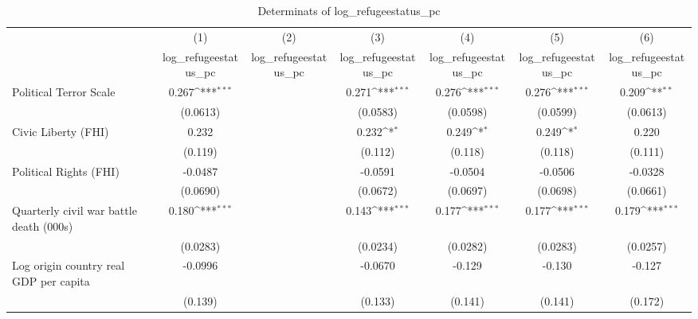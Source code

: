 \begin{table}[htbp]\centering
\def\sym#1{\ifmmode^{#1}\else\(^{#1}\)\fi}
\caption{Determinats of log\_refugeestatus\_pc}
\begin{tabular}{l*{6}{c}}
\hline\hline
                    &\multicolumn{1}{c}{(1)}&\multicolumn{1}{c}{(2)}&\multicolumn{1}{c}{(3)}&\multicolumn{1}{c}{(4)}&\multicolumn{1}{c}{(5)}&\multicolumn{1}{c}{(6)}\\
                    &\multicolumn{1}{c}{log\_refugeestatus\_pc}&\multicolumn{1}{c}{log\_refugeestatus\_pc}&\multicolumn{1}{c}{log\_refugeestatus\_pc}&\multicolumn{1}{c}{log\_refugeestatus\_pc}&\multicolumn{1}{c}{log\_refugeestatus\_pc}&\multicolumn{1}{c}{log\_refugeestatus\_pc}\\
\hline
Political Terror Scale&       0.267\sym{***}&                     &       0.271\sym{***}&       0.276\sym{***}&       0.276\sym{***}&       0.209\sym{**} \\
                    &    (0.0613)         &                     &    (0.0583)         &    (0.0598)         &    (0.0599)         &    (0.0613)         \\
[1em]
Civic Liberty (FHI) &       0.232         &                     &       0.232\sym{*}  &       0.249\sym{*}  &       0.249\sym{*}  &       0.220         \\
                    &     (0.119)         &                     &     (0.112)         &     (0.118)         &     (0.118)         &     (0.111)         \\
[1em]
Political Rights (FHI)&     -0.0487         &                     &     -0.0591         &     -0.0504         &     -0.0506         &     -0.0328         \\
                    &    (0.0690)         &                     &    (0.0672)         &    (0.0697)         &    (0.0698)         &    (0.0661)         \\
[1em]
Quarterly civil war battle death (000s)&       0.180\sym{***}&                     &       0.143\sym{***}&       0.177\sym{***}&       0.177\sym{***}&       0.179\sym{***}\\
                    &    (0.0283)         &                     &    (0.0234)         &    (0.0282)         &    (0.0283)         &    (0.0257)         \\
[1em]
Log origin country real GDP per capita&     -0.0996         &                     &     -0.0670         &      -0.129         &      -0.130         &      -0.127         \\
                    &     (0.139)         &                     &     (0.133)         &     (0.141)         &     (0.141)         &     (0.172)         \\

\end{tabular}
\end{table}
